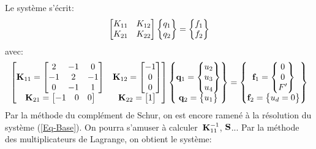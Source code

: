 Le système s'écrit:
\begin{equation}
\MM*{K_{11} & K_{12}\\ K_{21} & K_{22}}
\VV*{q_1\\ q_2} =
\VV*{f_1\\ f_2}
\end{equation}
avec:
\begin{equation*}
\MM*{%
\MM{K}_{11}=\MM*{2 & -1 & 0 \\ -1 & 2 & -1\\ 0 & -1 & 1} &
\MM{K}_{12}=\MM*{-1 \\ 0\\ 0}\\
\MM{K}_{21}=\MM*{-1 & 0 & 0} &
\MM{K}_{22} =\MM*{1}
}
\VV*{\VV{q}_1=\VV*{u_2\\u_3\\u_4}\\
\VV{q}_2 =\VV*{u_1}}
=
\VV*{\VV{f}_1 =\VV*{0\\0\\F'}\\ 
\VV{f}_2=\VV*{u_d=0}}
\end{equation*}
\medskipvm
Par la méthode du complément de Schur, on est encore ramené à la résolution du système (\ref{Eq-Base}).
On pourra s'amuser à calculer~$\MM{K}_{11}^{-1}$, $\MM{S}$...
\medskipvm
Par la méthode des multiplicateurs de Lagrange, on obtient le système:
